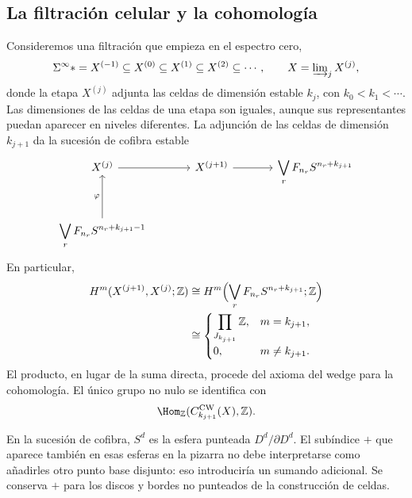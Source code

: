\subsection{La filtración celular y la cohomología}
Consideremos una filtración que empieza en el espectro cero,
\[
\Sigma^\infty *=X^{(-1)}\subseteq X^{(0)}\subseteq X^{(1)}
\subseteq X^{(2)}\subseteq\cdots,
\qquad X=\varinjlim\nolimits_jX^{(j)},
\]
donde la etapa $X^{(j)}$ adjunta las celdas de dimensión estable $k_j$, con $k_0<k_1<\cdots$. Las dimensiones de las celdas de una etapa son iguales, aunque sus representantes puedan aparecer en niveles diferentes. La adjunción de las celdas de dimensión $k_{j+1}$ da la sucesión de cofibra estable
\[
\begin{tikzcd}[column sep=large,row sep=large]
X^{(j)}\arrow[r]&X^{(j+1)}\arrow[r]
&\displaystyle\bigvee_r F_{n_r}S^{n_r+k_{j+1}}\\
\displaystyle\bigvee_r F_{n_r}S^{n_r+k_{j+1}-1}\arrow[u,"\varphi"]&&
\end{tikzcd}
\]
En particular,
\[
\begin{aligned}
H^m(X^{(j+1)},X^{(j)};\mathbb Z)
&\cong H^m\Bigl(\bigvee_rF_{n_r}S^{n_r+k_{j+1}};\mathbb Z\Bigr)\\
&\cong
\begin{cases}
\displaystyle\prod_{J_{k_{j+1}}}\mathbb Z,&m=k_{j+1},\\
0,&m\ne k_{j+1}.
\end{cases}
\end{aligned}
\]
El producto, en lugar de la suma directa, procede del axioma del wedge para la cohomología. El único grupo no nulo se identifica con
\[
\Hom_{\mathbb Z}(C_{k_{j+1}}^{\mathrm{CW}}(X),\mathbb Z).
\]

\begin{nota}
En la sucesión de cofibra, $S^d$ es la esfera punteada $D^d/\partial D^d$. El subíndice $+$ que aparece también en esas esferas en la pizarra no debe interpretarse como añadirles otro punto base disjunto: eso introduciría un sumando adicional. Se conserva $+$ para los discos y bordes no punteados de la construcción de celdas.
\end{nota}

